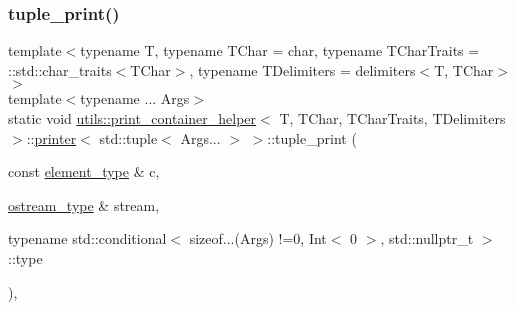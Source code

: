 \subsubsection{\texorpdfstring{tuple\_print()}{tuple\_print()}\hspace{0.1cm}{\footnotesize\ttfamily [2/3]}}
{\footnotesize\ttfamily template$<$typename T, typename T\+Char = char, typename T\+Char\+Traits = \+::std\+::char\+\_\+traits$<$\+T\+Char$>$, typename T\+Delimiters = delimiters$<$\+T, T\+Char$>$$>$ \\
template$<$typename ... Args$>$ \\
static void \mbox{\hyperlink{structutils_1_1print__container__helper}{utils\+::print\+\_\+container\+\_\+helper}}$<$ T, T\+Char, T\+Char\+Traits, T\+Delimiters $>$\+::\mbox{\hyperlink{structutils_1_1print__container__helper_1_1printer}{printer}}$<$ std\+::tuple$<$ Args... $>$ $>$\+::tuple\+\_\+print (\begin{DoxyParamCaption}\item[{const \mbox{\hyperlink{structutils_1_1print__container__helper_1_1printer_3_01std_1_1tuple_3_01_args_8_8_8_01_4_01_4_a1ca86cb16c37518fb257879ce8026459}{element\+\_\+type}} \&}]{c,  }\item[{\mbox{\hyperlink{structutils_1_1print__container__helper_1_1printer_3_01std_1_1tuple_3_01_args_8_8_8_01_4_01_4_a7a89933fa31d7a79f454cdf36211a73a}{ostream\+\_\+type}} \&}]{stream,  }\item[{typename std\+::conditional$<$ sizeof...(Args) !=0, Int$<$ 0 $>$, std\+::nullptr\+\_\+t $>$\+::type}]{ }\end{DoxyParamCaption})\hspace{0.3cm}{\ttfamily [inline]}, {\ttfamily [static]}}

\mbox{\label{structutils_1_1print__container__helper_1_1printer_3_01std_1_1tuple_3_01_args_8_8_8_01_4_01_4_a5b8429f1d2269ad890ccadbe461baf1b}} 
